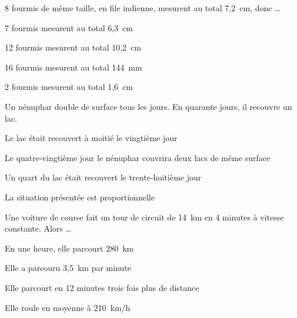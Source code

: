 \begin{QCM}
\begin{GroupeQCM}
    
    \begin{exercice}
      8 fourmis de même taille, en file indienne, mesurent au total 7,2 cm, donc \ldots
      \begin{ChoixQCM}{4}
      \item 7 fourmis   mesurent au total 6,3 cm
      \item 12 fourmis   mesurent au total 10,2 cm
      \item 16 fourmis mesurent au total 144 mm
      \item 2 fourmis mesurent au total 1,6 cm
      \end{ChoixQCM}
\begin{corrige}
   \end{corrige}
    \end{exercice}
    
    
     \begin{exercice}
      Un nénuphar double de surface tous les jours. En quarante jours, il recouvre un lac.
      \begin{ChoixQCM}{4}
      \item Le lac était recouvert à moitié le vingtième jour
      \item Le quatre‑vingtième jour le nénuphar couvrira deux lacs de même surface
      \item Un quart du lac était recouvert le trente‑huitième jour
      \item La situation présentée est proportionnelle
      \end{ChoixQCM}
\begin{corrige}
   \end{corrige}
    \end{exercice}
    
    
     \begin{exercice}
      Une voiture de course fait un tour de circuit de  14 km en 4 minutes à vitesse constante. Alors \ldots
      \begin{ChoixQCM}{4}
      \item En une heure, elle parcourt 280 km
      \item Elle a parcouru 3,5 km par minute
      \item Elle parcourt en 12 minutes trois fois plus de distance
      \item Elle roule en moyenne à 210 km/h
      \end{ChoixQCM}
\begin{corrige}
   \end{corrige}
    \end{exercice}

\end{GroupeQCM}
\end{QCM}

  